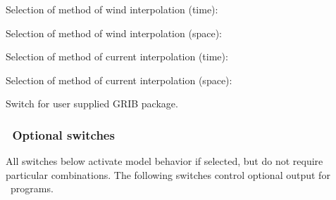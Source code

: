 \noindent
Selection of method of wind interpolation (time):
\begin{slist}
\end{slist}

\pb \noindent
Selection of method of wind interpolation (space):
\begin{slist}
\end{slist}

\noindent
Selection of method of current interpolation (time):
\begin{slist}
\end{slist}

\noindent
Selection of method of current interpolation (space):
\begin{slist}
\end{slist}

\noindent
Switch for user supplied GRIB package.
\begin{slist}
\end{slist}


\vsssub
\subsubsection{~Optional switches} \label{sub:opt_switch}
\vsssub

All switches below activate model behavior if selected, but do not require
particular combinations. The following switches control optional output for
\ws\ programs.

